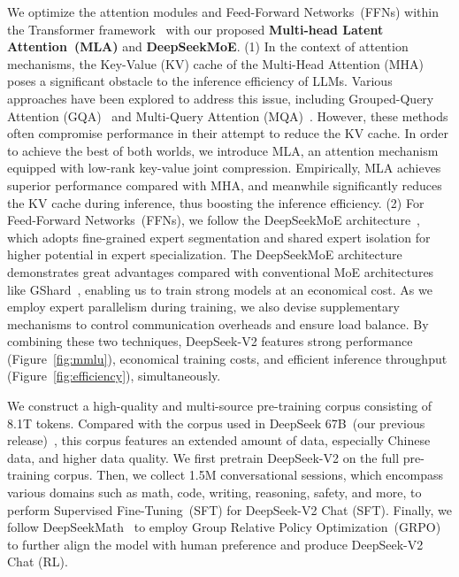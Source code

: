 We optimize the attention modules and Feed-Forward Networks~(FFNs) within the Transformer framework~\citep{transformer} with our proposed \textbf{Multi-head Latent Attention~(MLA)} and \textbf{DeepSeekMoE}.
(1)
In the context of attention mechanisms, the Key-Value (KV) cache of the Multi-Head Attention (MHA)~\citep{transformer} poses a significant obstacle to the inference efficiency of LLMs. Various approaches have been explored to address this issue, including Grouped-Query Attention (GQA)~\citep{ainslie2023gqa} and Multi-Query Attention (MQA)~\citep{mqa}. However, these methods often compromise performance in their attempt to reduce the KV cache. In order to achieve the best of both worlds, we introduce MLA, an attention mechanism equipped with low-rank key-value joint compression. Empirically, MLA achieves superior performance compared with MHA, and meanwhile significantly reduces the KV cache during inference, thus boosting the inference efficiency. (2) For Feed-Forward Networks~(FFNs), we follow the DeepSeekMoE architecture~\citep{deepseekmoe}, which adopts fine-grained expert segmentation and shared expert isolation for higher potential in expert specialization. The DeepSeekMoE architecture demonstrates great advantages compared with conventional MoE architectures like GShard~\citep{gshard}, enabling us to train strong models at an economical cost. As we employ expert parallelism during training, we also devise supplementary mechanisms to control communication overheads and ensure load balance. By combining these two techniques, DeepSeek-V2 features strong performance (Figure~\ref{fig:mmlu}), economical training costs, and efficient inference throughput (Figure~\ref{fig:efficiency}), simultaneously. 

We construct a high-quality and multi-source pre-training corpus consisting of 8.1T tokens. Compared with the corpus used in DeepSeek 67B~(our previous release)~\citep{deepseek1}, this corpus features an extended amount of data, especially Chinese data, and higher data quality. We first pretrain DeepSeek-V2 on the full pre-training corpus. Then, we collect 1.5M conversational sessions, which encompass various domains such as math, code, writing, reasoning, safety, and more, to perform Supervised Fine-Tuning~(SFT) for DeepSeek-V2 Chat (SFT). Finally, we follow DeepSeekMath~\citep{deepseekmath} to employ Group Relative Policy Optimization~(GRPO) to further align the model with human preference and produce DeepSeek-V2 Chat (RL).


